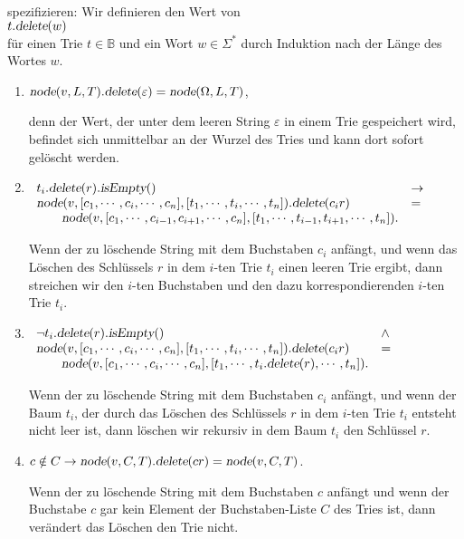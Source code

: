 \\[0.2cm]
spezifizieren:  Wir definieren den Wert von \\[0.2cm]
\hspace*{1.3cm} 
$t.\textsl{delete}(w)$
\\[0.2cm]
f\"ur einen Trie $t \in \mathbb{B}$ und ein Wort $w \in \Sigma^*$
durch Induktion nach der L\"ange des Wortes $w$.
\begin{enumerate}
\item $\textsl{node}(v,L,T).\textsl{delete}(\varepsilon) = \textsl{node}(\Omega,L,T)$,

      denn der Wert, der unter dem leeren String $\varepsilon$ in einem Trie
      gespeichert wird, befindet sich unmittelbar an der Wurzel des Tries und
      kann dort sofort gel\"oscht werden.
\item $\begin{array}[t]{ll}
       t_i.\textsl{delete}(r).\textsl{isEmpty}()   & \rightarrow \\
       \textsl{node}(v, [c_1,\cdots,c_i,\cdots,c_n],[t_1,\cdots,t_i,\cdots,t_n]).\textsl{delete}(c_ir) 
       & = \\
       \qquad 
       \textsl{node}(v, [c_1,\cdots,c_{i-1},c_{i+1},\cdots,c_n],[t_1,\cdots,t_{i-1},t_{i+1},\cdots,t_n]).
       \end{array}
       $

       Wenn der zu l\"oschende String mit dem Buchstaben $c_i$ anf\"angt, und wenn
       das L\"oschen des Schl\"ussels $r$ in dem $i$-ten Trie $t_i$ einen leeren
       Trie ergibt, dann streichen wir den $i$-ten Buchstaben und den dazu
       korrespondierenden $i$-ten Trie $t_i$.
\item $\begin{array}[t]{ll}
       \neg t_i.\textsl{delete}(r).\textsl{isEmpty}()   & \wedge \\
       \textsl{node}(v, [c_1,\cdots,c_i,\cdots,c_n],[t_1,\cdots,t_i,\cdots,t_n]).\textsl{delete}(c_ir) 
       & = \\
       \qquad \textsl{node}(v, [c_1,\cdots,c_i,\cdots,c_n],[t_1,\cdots,t_i.\textsl{delete}(r),\cdots,t_n]).
       \end{array}
       $

       Wenn der zu l\"oschende String mit dem Buchstaben $c_i$ anf\"angt, und wenn
       der Baum $t_i$, der durch das  L\"oschen des Schl\"ussels $r$ in dem $i$-ten
       Trie $t_i$ entsteht nicht leer ist, dann l\"oschen wir rekursiv in dem Baum $t_i$ den Schl\"ussel
       $r$.
\item $c \notin C \rightarrow \textsl{node}(v, C, T).\textsl{delete}(cr) = \textsl{node}(v, C, T)$.

       Wenn der zu l\"oschende String mit dem Buchstaben $c$ anf\"angt und wenn der
       Buchstabe $c$ gar kein Element der Buchstaben-Liste $C$ des Tries
       ist, dann ver\"andert das L\"oschen den Trie nicht.
\end{enumerate}

